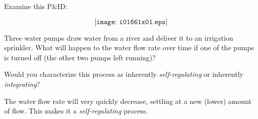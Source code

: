 

Examine this P\&ID:
 
$$\texttt{[image: i01661x01.eps]}$$

Three water pumps draw water from a river and deliver it to an irrigation sprinkler.  What will happen to the water flow rate over time if one of the pumps is turned off (the other two pumps left running)?

\vskip 10pt

Would you characterize this process as inherently {\it self-regulating} or inherently {\it integrating}?







The water flow rate will very quickly decrease, settling at a new (lower) amount of flow.  This makes it a {\it self-regulating} process.












